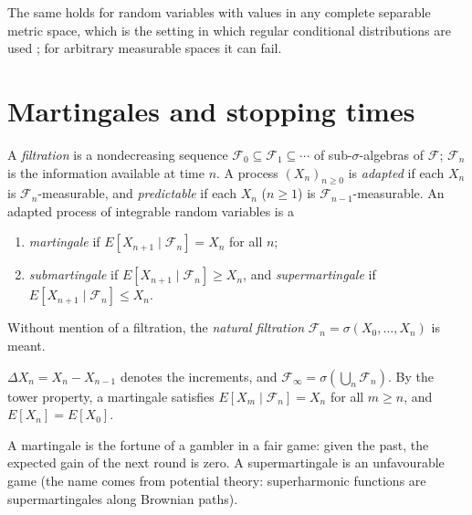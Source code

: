 The same holds for random variables with values in any complete separable metric space, which is the setting in which regular conditional distributions are used \cite{kallenberg}; for arbitrary measurable spaces it
can fail.

\section{Martingales and stopping times}\label{martingales:section-martingales}

\begin{definition}\label{martingales:definition-martingale}
A \emph{filtration} is a nondecreasing sequence $\mathcal{F}_0 \subseteq \mathcal{F}_1 \subseteq \cdots$ of sub-$\sigma$-algebras of $\mathcal{F}$; $\mathcal{F}_n$ is the information available at time $n$. A process $(X_n)_{n \geq 0}$ is
\emph{adapted} if each $X_n$ is $\mathcal{F}_n$-measurable, and \emph{predictable} if each $X_n$ ($n \geq 1$) is $\mathcal{F}_{n-1}$-measurable. An adapted process of integrable random variables is a
\begin{enumerate}
\item \emph{martingale} if $E[X_{n+1} \mid \mathcal{F}_n] = X_n$ for all $n$;
\item \emph{submartingale} if $E[X_{n+1} \mid \mathcal{F}_n] \geq X_n$, and \emph{supermartingale} if $E[X_{n+1} \mid \mathcal{F}_n] \leq X_n$.
\end{enumerate}
Without mention of a filtration, the \emph{natural filtration} $\mathcal{F}_n = \sigma(X_0, \ldots, X_n)$ is meant.
\end{definition}

\begin{notation}\label{martingales:notation-martingale}
$\Delta X_n = X_n - X_{n-1}$ denotes the increments, and $\mathcal{F}_\infty = \sigma(\bigcup_n\mathcal{F}_n)$. By the tower property, a martingale satisfies $E[X_m \mid \mathcal{F}_n] = X_n$ for all $m \geq n$, and $E[X_n] = E[X_0]$.
\end{notation}

A martingale is the fortune of a gambler in a fair game: given the past, the expected gain of the next round is zero. A supermartingale is an unfavourable game (the name comes from potential theory: superharmonic functions
are supermartingales along Brownian paths).

